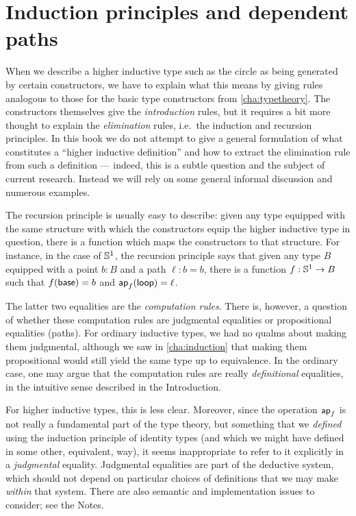 \vspace*{0pt plus 20ex}

\section{Induction principles and dependent paths}
\label{sec:dependent-paths}

When we describe a higher inductive type such as the circle as being generated by certain constructors, we have to explain what this means by giving rules analogous to those for the basic type constructors from \autoref{cha:typetheory}.
The constructors themselves give the \emph{introduction} rules, but it requires a bit more thought to explain the \emph{elimination} rules, i.e.\ the induction and recursion principles.
In this book we do not attempt to give a general formulation of what constitutes a ``higher inductive definition'' and how to extract the elimination rule from such a definition --- indeed, this is a subtle question and the subject of current research.
Instead we will rely on some general informal discussion and numerous examples.

%
The recursion principle is usually easy to describe: given any type equipped with the same structure with which the constructors equip the higher inductive type in question, there is a function which maps the constructors to that structure.
For instance, in the case of $\mathbb{S}^1$, the recursion principle says that given any type $B$ equipped with a point $b:B$ and a path $\ell:b=b$, there is a function $f:\mathbb{S}^1\to B$ such that $f(\mathsf{base})=b$ and $\mathsf{ap}_{f} (\mathsf{loop}) = \ell$.

The latter two equalities are the \emph{computation rules}.
There is, however, a question of whether these computation rules are judgmental equalities or propositional equalities (paths).
For ordinary inductive types, we had no qualms about making them judgmental, although we saw in \autoref{cha:induction} that making them propositional would still yield the same type up to equivalence.
In the ordinary case, one may argue that the computation rules are really \emph{definitional} equalities, in the intuitive sense described in the Introduction.

For higher inductive types, this is less clear. %
Moreover, since the operation $\mathsf{ap}_{f}$ is not really a fundamental part of the type theory, but something that we \emph{defined} using the induction principle of identity types (and which we might have defined in some other, equivalent, way), it seems inappropriate to refer to it explicitly in a \emph{judgmental} equality.
Judgmental equalities are part of the deductive system, which should not depend on particular choices of definitions that we may make \emph{within} that system.
There are also semantic and implementation issues to consider; see the Notes.

